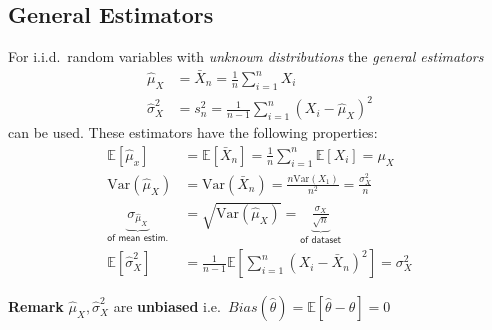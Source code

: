 \subsection{General Estimators}
For i.i.d.\ random variables with \textit{unknown distributions} the \textit{general estimators}
\noindent\begin{align*}
    \hat{\mu}_{X}    & =\bar{X}_{n}=\frac1n\sum_{i=1}^{n}X_{i}             \\
    \hat{\sigma}_X^2 & =s_n^2=\frac1{n-1}\sum_{i=1}^n{(X_i-\hat{\mu}_X)}^2
\end{align*}
can be used. These estimators have the following properties:
\noindent\begin{align*}
    \mathbb{E}[\hat{\mu}_x]                                       & =\mathbb{E}[\bar{X}_n]=\frac1n\sum_{i=1}^n\mathbb{E}[X_i]=\mu_X                                    \\
    \mathrm{Var}(\hat{\mu}_X)                                     & =\mathrm{Var}(\bar{X}_n)=\frac{n\mathrm{Var}(X_1)}{n^2}=\frac{\sigma_X^2}n                         \\
    \underbrace{\sigma_{\hat{\mu}_{X}}}_{\textsf{of mean estim.}} & =\sqrt{\mathrm{Var}(\hat{\mu}_{X})}=\underbrace{\frac{\sigma_{X}}{\sqrt{n}}}_{\textsf{of dataset}} \\
    \mathbb{E}[\hat{\sigma}_X^2]                                  & =\frac1{n-1}\mathbb{E}\left[\sum_{i=1}^n{\left(X_i-\bar{X}_n\right)}^2\right] = \sigma^2_X
\end{align*}

\textbf{Remark} $\hat{\mu}_X, \hat{\sigma}_X^2$ are \textbf{unbiased} i.e.\ $Bias(\hat{\theta})=\mathbb{E}[\hat{\theta}-\theta]=0$
